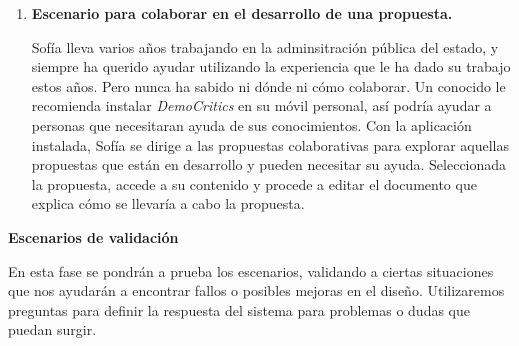 \begin{enumerate}[label=\textbf{\Roman*}]
\item \textbf{Escenario para colaborar en el desarrollo de una propuesta.}

Sofía lleva varios años trabajando en la adminsitración pública del estado, y siempre ha querido ayudar utilizando la experiencia que le ha dado su trabajo estos años. Pero nunca ha sabido ni dónde ni cómo colaborar. Un conocido le recomienda instalar \textit{DemoCritics} en su móvil personal, así podría ayudar a personas que necesitaran ayuda de sus conocimientos. Con la aplicación instalada, Sofía se dirige a las propuestas colaborativas para explorar aquellas propuestas que están en desarrollo y pueden necesitar su ayuda. Seleccionada la propuesta, accede a su contenido y procede a editar el documento que explica cómo se llevaría a cabo la propuesta.

\end{enumerate}

\textbf{Escenarios de validación}

En esta fase se pondrán a prueba los escenarios, validando a ciertas situaciones que nos ayudarán a encontrar fallos o posibles mejoras en el diseño. Utilizaremos preguntas para definir la respuesta del sistema para problemas o dudas que puedan surgir.

